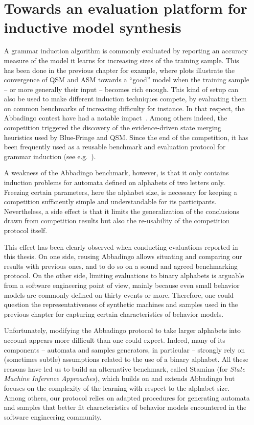 \chapter{Towards an evaluation platform for inductive model synthesis\label{chapter:stamina}}

A grammar induction algorithm is commonly evaluated by reporting an accuracy measure of the model it learns for increasing sizes of the training sample. This has been done in the previous chapter for example, where plots illustrate the convergence of QSM and ASM towards a ``good'' model when the training sample -- or more generally their input -- becomes rich enough. This kind of setup can also be used to make different induction techniques compete, by evaluating them on common benchmarks of increasing difficulty for instance. In that respect, the Abbadingo contest have had a notable impact~\cite{Lang98}. Among others indeed, the competition triggered the discovery of the evidence-driven state merging heuristics used by Blue-Fringe and QSM. Since the end of the competition, it has been frequently used as a reusable benchmark and evaluation protocol for grammar induction (see e.g.~\cite{Lucas:2003, Bongard:2005, Lucas:2005, Adriaans:2006, Dupont:2008, Lambeau:2008, Heule:2010}).

A weakness of the Abbadingo benchmark, however, is that it only contains induction problems for automata defined on alphabets of two letters only. Freezing certain parameters, here the alphabet size, is necessary for keeping a competition sufficiently simple and understandable for its participants. Nevertheless, a side effect is that it limits the generalization of the conclusions drawn from competition results but also the re-usability of the competition protocol itself. 

This effect has been clearly observed when conducting evaluations reported in this thesis. On one side, reusing Abbadingo allows situating and comparing our results with previous ones, and to do so on a sound and agreed benchmarking protocol. On the other side, limiting evaluations to binary alphabets is arguable from a software engineering point of view, mainly because even small behavior models are commonly defined on thirty events or more. Therefore, one could question the representativeness of synthetic machines and samples used in the previous chapter for capturing certain characteristics of behavior models. 

Unfortunately, modifying the Abbadingo protocol to take larger alphabets into account appears more difficult than one could expect. Indeed, many of its components -- automata and samples generators, in particular -- strongly rely on (sometimes subtle) assumptions related to the use of a binary alphabet. All these reasons have led us to build an alternative benchmark, called Stamina (for \emph{State Machine Inference Approaches}), which builds on and extends Abbadingo but focuses on the complexity of the learning with respect to the alphabet size. Among others, our protocol relies on adapted procedures for generating automata and samples that better fit characteristics of behavior models encountered in the software engineering community.

